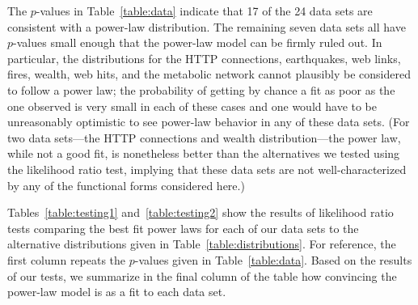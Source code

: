 \documentclass[final]{siamltex}
\begin{document}
The $p$-values in Table~\ref{table:data} indicate that 17 of the 24 data
sets are consistent with a power-law distribution.  The remaining seven
data sets all have $p$-values small enough that the power-law model can be
firmly ruled out.  In particular, the distributions for the HTTP
connections, earthquakes, web links, fires, wealth, web hits, and the
metabolic network cannot plausibly be considered to follow a power law; the
probability of getting by chance a fit as poor as the one observed is very
small in each of these cases and one would have to be unreasonably
optimistic to see power-law behavior in any of these data sets.  (For two
data sets---the HTTP connections and wealth distribution---the power law,
while not a good fit, is nonetheless better than the alternatives we tested
using the likelihood ratio test, implying that these data sets are not
well-characterized by any of the functional forms considered here.)

Tables~\ref{table:testing1} and~\ref{table:testing2} show the results of
likelihood ratio tests comparing the best fit power laws for each of our
data sets to the alternative distributions given in
Table~\ref{table:distributions}.  For reference, the first column repeats
the $p$-values given in Table~\ref{table:data}.  Based on the results of
our tests, we summarize in the final column of the table how convincing the
power-law model is as a fit to each data set.
\end{document}
